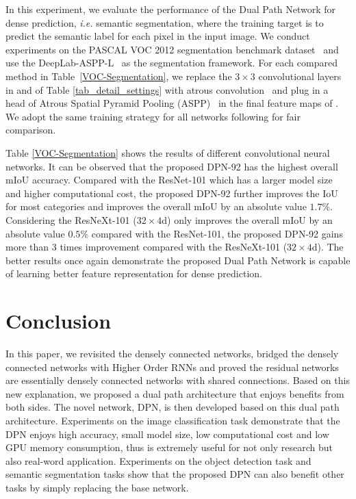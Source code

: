 \documentclass{article}
\begin{document}
In this experiment, we evaluate the performance of the Dual Path Network for dense prediction, \emph{i.e.} semantic segmentation, where the training target is to predict the semantic label for each pixel in the input image. We conduct experiments on the PASCAL VOC 2012 segmentation benchmark dataset~\citep{pascal2010} and use the DeepLab-ASPP-L~\cite{chen2016deeplab} as the segmentation framework. For each compared method in Table~\ref{VOC-Segmentation}, we replace the $3\times3$ convolutional layers in {} and {} of Table \ref{tab_detail_settings} with atrous convolution~\cite{chen2016deeplab} and plug in a head of Atrous Spatial Pyramid Pooling (ASPP)~\citep{chen2016deeplab} in the final feature maps of {}. We adopt the same training strategy for all networks following \cite{chen2016deeplab} for fair comparison.


Table \ref{VOC-Segmentation} shows the results of different convolutional neural networks. It can be observed that the proposed DPN-92 has the highest overall mIoU accuracy. Compared with the ResNet-101 which has a larger model size and higher computational cost, the proposed DPN-92 further improves the IoU for most categories and improves the overall mIoU by an absolute value $1.7\%$. Considering the ResNeXt-101 ($32\times4$d) only improves the overall mIoU by an absolute value $0.5\%$ compared with the ResNet-101, the proposed DPN-92 gains more than $3$ times improvement compared with the ResNeXt-101 ($32\times4$d). The better results once again demonstrate the proposed Dual Path Network is capable of learning better feature representation for dense prediction.



% 
%
%
%
\section{Conclusion}

\vskip -0.05in
In this paper, we revisited the densely connected networks, bridged the densely connected networks with Higher Order RNNs and proved the residual networks are essentially densely connected networks with shared connections. Based on this new explanation, we proposed a dual path architecture that enjoys benefits from both sides. The novel network, DPN, is then developed based on this dual path architecture. Experiments on the image classification task demonstrate that the DPN enjoys high accuracy, small model size, low computational cost and low GPU memory consumption, thus is extremely useful for not only research but also real-word application. Experiments on the object detection task and semantic segmentation tasks show that the proposed DPN can also benefit other tasks by simply replacing the base network.
\end{document}
